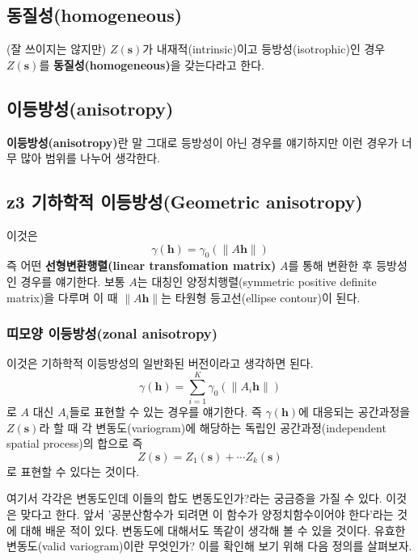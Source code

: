 \documentclass[b5paper,]{scrbook}
\theoremstyle{plain}
\theoremstyle{definition}
\numberwithin{equation}{section}
\begin{document}
\subsection{동질성(homogeneous)}\label{homogeneous}

(잘 쓰이지는 않지만) \(Z(\mathbf{s})\)가 내재적(intrinsic)이고
등방성(isotrophic)인 경우 \(Z(\mathbf{s})\)를
\textbf{동질성(homogeneous)}을 갖는다라고 한다.

\subsection{이등방성(anisotropy)}\label{anisotropy}

\textbf{이등방성(anisotropy)}란 말 그대로 등방성이 아닌 경우를
얘기하지만 이런 경우가 너무 많아 범위를 나누어 생각한다.

\subsection{z3 기하학적 이등방성(Geometric
anisotropy)}\label{z3--geometric-anisotropy}

이것은 \[\gamma(\mathbf{h})=\gamma_{0}(\|A\mathbf{h}\|)\] 즉 어떤
\textbf{선형변환행렬(linear transfomation matrix)} \(A\)를 통해 변환한
후 등방성인 경우를 얘기한다. 보통 \(A\)는 대칭인 양정치행렬(symmetric
positive definite matrix)을 다루며 이 때 \(\|A\mathbf{h}\|\)는 타원형
등고선(ellipse contour)이 된다.

\subsubsection{띠모양 이등방성(zonal
anisotropy)}\label{-zonal-anisotropy}

이것은 기하학적 이등방성의 일반화된 버전이라고 생각하면 된다.
\[\gamma(\mathbf{h})=\sum_{i=1}^{K}\gamma_{0}(\|A_{i}\mathbf{h}\|)\] 로
\(A\) 대신 \(A_{i}\)들로 표현할 수 있는 경우를 얘기한다. 즉
\(\gamma(\mathbf{h})\)에 대응되는 공간과정을 \(Z(\mathbf{s})\)라 할 때
각 변동도(variogram)에 해당하는 독립인 공간과정(independent spatial
process)의 합으로 즉
\[Z(\mathbf{s})=Z_{1}(\mathbf{s})+ \cdots Z_{k}(\mathbf{s})\] 로 표현할
수 있다는 것이다.

여기서 각각은 변동도인데 이들의 합도 변동도인가?라는 궁금증을 가질 수
있다. 이것은 맞다고 한다. 앞서 '공분산함수가 되려면 이 함수가
양정치함수이어야 한다'라는 것에 대해 배운 적이 있다. 변동도에 대해서도
똑같이 생각해 볼 수 있을 것이다. 유효한 변동도(valid variogram)이란
무엇인가? 이를 확인해 보기 위해 다음 정의를 살펴보자.
\end{document}
